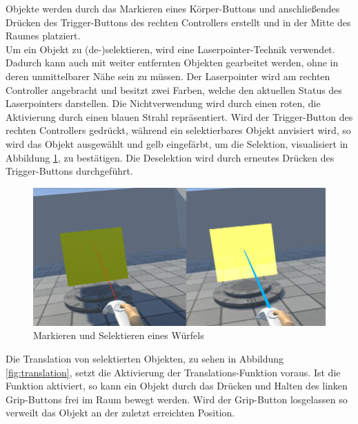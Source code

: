 \noindent Objekte werden durch das Markieren eines Körper-Buttons und anschließendes Drücken des Trigger-Buttons des rechten Controllers erstellt und in der Mitte des Raumes platziert.\\
Um ein Objekt zu (de-)selektieren, wird eine Laserpointer-Technik verwendet. Dadurch kann auch mit weiter entfernten Objekten gearbeitet werden, ohne in deren unmittelbarer Nähe sein zu müssen. Der Laserpointer wird am rechten Controller angebracht und besitzt zwei Farben, welche den aktuellen Status des Laserpointers darstellen. Die Nichtverwendung wird durch einen roten, die Aktivierung durch einen blauen Strahl repräsentiert. Wird der Trigger-Button des rechten Controllers gedrückt, während ein selektierbares Objekt anvisiert wird, so wird das Objekt ausgewählt und gelb eingefärbt, um die Selektion, visualisiert in Abbildung \ref{fig:selektion}, zu bestätigen. Die Deselektion wird durch erneutes Drücken des Trigger-Buttons durchgeführt.

\begin{figure}[h]
\captionsetup{width=.7\linewidth}
\includegraphics[scale=0.5]{Bilder/Hauptteil/Bearbeitet/SelektionMerge}
\centering
\caption{Markieren und Selektieren eines Würfels}
\label{fig:selektion}
\end{figure}

\noindent Die Translation von selektierten Objekten, zu sehen in Abbildung \ref{fig:translation}, setzt die Aktivierung der Translations-Funktion voraus. Ist die Funktion aktiviert, so kann ein Objekt durch das Drücken und Halten des linken Grip-Buttons frei im Raum bewegt werden. Wird der Grip-Button losgelassen so verweilt das Objekt an der zuletzt erreichten Position.

